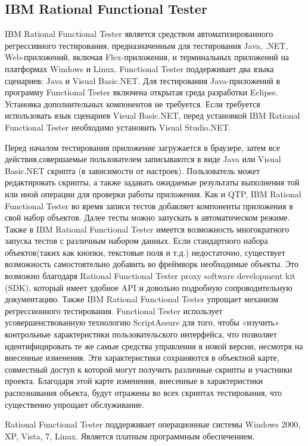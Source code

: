 \subsection{IBM Rational Functional Tester}

IBM Rational Functional Tester является средством автоматизированного 
регрессивного тестирования, предназначенным для тестирования Java, .NET, 
Web-приложений, включая Flex-приложения, и терминальных приложений на 
платформах Windows и Linux. Functional Tester поддерживает два языка 
сценариев: Java и Visual Basic.NET. Для тестирования Java-приложений в 
программу Functional Tester включена открытая среда разработки Eclipse. 
Установка дополнительных компонентов не требуется. Если требуется 
использовать язык сценариев Visual Basic.NET, перед установкой IBM 
Rational Functional Tester необходимо установить Visual Studio.NET.

Перед началом тестирования приложение загружается в браузере, затем все 
действия,совершаемые пользователем записываются в виде Java или Visual 
Basic.NET скрипта (в зависимости от настроек). Пользователь может 
редактировать скрипты, а также задавать ожидаемые результаты выполнения 
той или иной операции для проверки работы приложения. Как и QTP, IBM 
Rational Functional Tester во время записи тестов добавляет компоненты 
приложения в свой набор объектов. Далее тесты можно запускать в 
автоматическом режиме. Также в IBM Rational Functional Tester имеется 
возможность многократного запуска тестов с различным набором данных. 
Если стандартного набора объектов(таких как кнопки, текстовые поля и т.д.) 
недостаточно, существует возможность самостоятельно добавить во фреймворк 
необходимые объекты. Это возможно благодаря Rational Functional Tester 
proxy software development kit (SDK), который имеет удобное API и 
довольно подробную сопроводительную документацию.
Также IBM Rational Functional Tester упрощает механизм регрессионного 
тестирования. Functional Tester использует усовершенствованную технологию 
ScriptAssure для того, чтобы «изучить» контрольные характеристики 
пользовательского интерфейса, что позволяет идентифицировать те же самые 
средства управления в новой версии, несмотря на внесенные изменения. 
Эти характеристики сохраняются в объектной карте, совместный доступ к 
которой могут получить различные скрипты и участники проекта. 
Благодаря этой карте изменения, внесенные в характеристики распознавания 
объекта, будут отражены во всех скриптах тестирования, что существенно 
упрощает обслуживание. 

Rational Functional Tester поддерживает операционные системы Windows 
2000, XP, Vista, 7, Linux. Является платным программным обеспечением.

